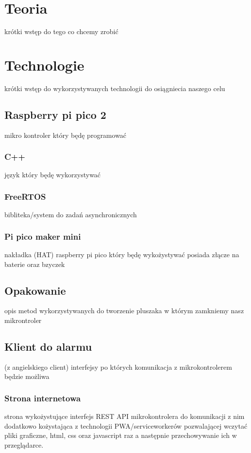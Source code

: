 \documentclass[a4paper,12pt,oneside,onecolumn]{book}
\begin{document}
\chapter*{Teoria}
krótki wstęp do tego co chcemy zrobić
\chapter{Technologie}
krótki wstęp do wykorzystywanych technologii do osiągniecia naszego celu
\section{Raspberry pi pico 2}
mikro kontroler który będę programować
\subsection{C++}
język który będę wykorzystywać
\subsection{FreeRTOS}
bibliteka/system do zadań asynchronicznych
\subsection{Pi pico maker mini}
nakładka (HAT) raspberry pi pico który będę wykożystywać
\newline\newline
posiada złącze na baterie oraz bzyczek
\section{Opakowanie}
opis metod wykorzystywanych do tworzenie pluszaka w którym zamkniemy nasz mikrontroler
\section{Klient do alarmu}
(z angielskiego client) interfejsy po których komunikacja z mikrokontrolerem będzie możliwa
\subsection{Strona internetowa}
strona wykożystujące interfejs REST API mikrokontrolera do komunikacji z nim
\newline\newline
dodatkowo kożystająca z technologii PWA/serviceworkerów pozwalającej wczytać pliki graficzne, html, css oraz javascript raz a następnie przechowywanie ich w przeglądarce.
\end{document}
